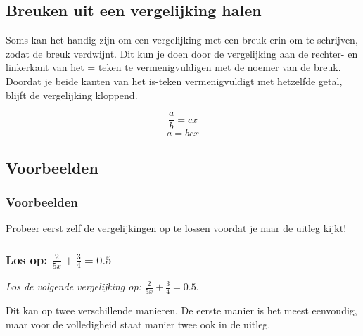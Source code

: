\documentclass[
  a4paper,
]{scrbook}
\theoremstyle{definition}
\theoremstyle{remark}
\begin{document}
\subsection*{Breuken uit een vergelijking
halen}\label{breuken-uit-een-vergelijking-halen}

Soms kan het handig zijn om een vergelijking met een breuk erin om te
schrijven, zodat de breuk verdwijnt. Dit kun je doen door de
vergelijking aan de rechter- en linkerkant van het = teken te
vermenigvuldigen met de noemer van de breuk. Doordat je beide kanten van
het is-teken vermenigvuldigt met hetzelfde getal, blijft de vergelijking
kloppend.

\[
\frac{a}{b} = cx
\] \[
a = bcx
\]

\subsection*{Voorbeelden}\label{voorbeelden}

\subsubsection{Voorbeelden}

Probeer eerst zelf de vergelijkingen op te lossen voordat je naar de
uitleg kijkt!

\subsubsection{\texorpdfstring{Los op:
\(\frac{2}{5x}+\frac{3}{4} = 0.5\)}{Los op: \textbackslash frac\{2\}\{5x\}+\textbackslash frac\{3\}\{4\} = 0.5}}

\emph{Los de volgende vergelijking op:}
\(\frac{2}{5x}+\frac{3}{4} = 0.5\).

Dit kan op twee verschillende manieren. De eerste manier is het meest
eenvoudig, maar voor de volledigheid staat manier twee ook in de uitleg.
\end{document}
